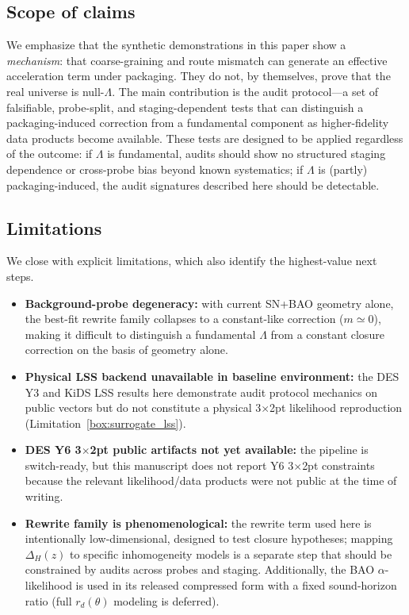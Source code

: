 \documentclass[11pt]{article}
\theoremstyle{definition}
\theoremstyle{plain}
\theoremstyle{remark}
\newcounter{limitation}[section]
\begin{document}
\subsection{Scope of claims}\label{sec:discussion:scope}
We emphasize that the synthetic demonstrations in this paper show a \emph{mechanism}: that coarse-graining and route mismatch can generate an effective acceleration term under packaging.
They do not, by themselves, prove that the real universe is null-$\Lambda$.
The main contribution is the audit protocol---a set of falsifiable, probe-split, and staging-dependent tests that can distinguish a packaging-induced correction from a fundamental component as higher-fidelity data products become available.
These tests are designed to be applied regardless of the outcome: if $\Lambda$ is fundamental, audits should show no structured staging dependence or cross-probe bias beyond known systematics; if $\Lambda$ is (partly) packaging-induced, the audit signatures described here should be detectable.

\subsection{Limitations}\label{sec:discussion:limitations}
We close with explicit limitations, which also identify the highest-value next steps.

\begin{itemize}
  \item \textbf{Background-probe degeneracy:} with current SN+BAO geometry alone, the best-fit rewrite family collapses to a constant-like correction ($m\simeq 0$), making it difficult to distinguish a fundamental $\Lambda$ from a constant closure correction on the basis of geometry alone.
  \item \textbf{Physical LSS backend unavailable in baseline environment:} the DES Y3 and KiDS LSS results here demonstrate audit protocol mechanics on public vectors but do not constitute a physical 3$\times$2pt likelihood reproduction (Limitation~\ref{box:surrogate_lss}).
  \item \textbf{DES Y6 3$\times$2pt public artifacts not yet available:} the pipeline is switch-ready, but this manuscript does not report Y6 3$\times$2pt constraints because the relevant likelihood/data products were not public at the time of writing.
  \item \textbf{Rewrite family is phenomenological:} the rewrite term used here is intentionally low-dimensional, designed to test closure hypotheses; mapping $\Delta_H(z)$ to specific inhomogeneity models is a separate step that should be constrained by audits across probes and staging. Additionally, the BAO $\alpha$-likelihood is used in its released compressed form with a fixed sound-horizon ratio (full $r_d(\theta)$ modeling is deferred).
\end{itemize}
\end{document}
